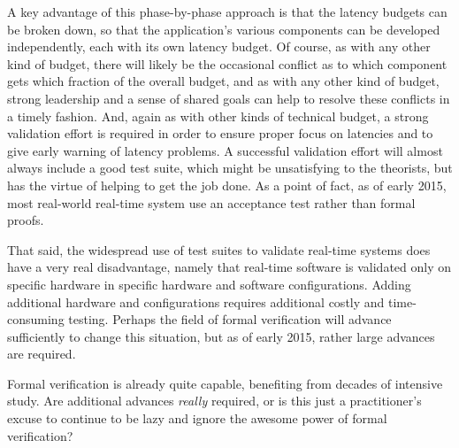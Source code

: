 A key advantage of this phase-by-phase approach is that the latency
budgets can be broken down, so that the application's various components
can be developed independently, each with its own latency budget.
Of course, as with any other kind of budget, there will likely be the
occasional conflict as to which component gets which fraction of the
overall budget, and as with any other kind of budget, strong leadership
and a sense of shared goals can help to resolve these conflicts in
a timely fashion.
And, again as with other kinds of technical budget, a strong validation
effort is required in order to ensure proper focus on latencies and to
give early warning of latency problems.
A successful validation effort will almost always include a good test
suite, which might be unsatisfying to the theorists, but has the virtue
of helping to get the job done.
As a point of fact, as of early 2015, most real-world real-time system
use an acceptance test rather than formal proofs.

That said, the widespread use of test suites to validate real-time systems
does have a very real disadvantage, namely that real-time software is
validated only on specific hardware in specific hardware and software
configurations.
Adding additional hardware and configurations requires additional costly and
time-consuming testing.
Perhaps the field of formal verification will advance sufficiently to
change this situation, but as of early 2015, rather
large advances are required.

\QuickQuiz{}
	Formal verification is already quite capable, benefiting from
	decades of intensive study.
	Are additional advances \emph{really} required, or is this
	just a practitioner's excuse to continue to be lazy and ignore
	the awesome power of formal verification?
 \QuickQuizEnd

